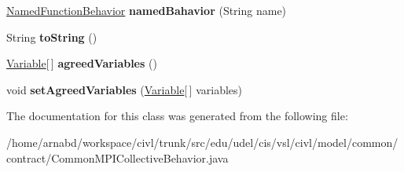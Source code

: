 \begin{DoxyCompactItemize}
\item 
\hypertarget{classedu_1_1udel_1_1cis_1_1vsl_1_1civl_1_1model_1_1common_1_1contract_1_1CommonMPICollectiveBehavior_a52d8d5bb5323585c16830e81bdd0572c}{}\hyperlink{interfaceedu_1_1udel_1_1cis_1_1vsl_1_1civl_1_1model_1_1IF_1_1contract_1_1NamedFunctionBehavior}{Named\+Function\+Behavior} {\bfseries named\+Bahavior} (String name)\label{classedu_1_1udel_1_1cis_1_1vsl_1_1civl_1_1model_1_1common_1_1contract_1_1CommonMPICollectiveBehavior_a52d8d5bb5323585c16830e81bdd0572c}

\item 
\hypertarget{classedu_1_1udel_1_1cis_1_1vsl_1_1civl_1_1model_1_1common_1_1contract_1_1CommonMPICollectiveBehavior_ac7ac11f1d649557ed4fe312abd7c0ea4}{}String {\bfseries to\+String} ()\label{classedu_1_1udel_1_1cis_1_1vsl_1_1civl_1_1model_1_1common_1_1contract_1_1CommonMPICollectiveBehavior_ac7ac11f1d649557ed4fe312abd7c0ea4}

\item 
\hypertarget{classedu_1_1udel_1_1cis_1_1vsl_1_1civl_1_1model_1_1common_1_1contract_1_1CommonMPICollectiveBehavior_ac275fd669c48e972b35ddadf31b9be1a}{}\hyperlink{interfaceedu_1_1udel_1_1cis_1_1vsl_1_1civl_1_1model_1_1IF_1_1variable_1_1Variable}{Variable}\mbox{[}$\,$\mbox{]} {\bfseries agreed\+Variables} ()\label{classedu_1_1udel_1_1cis_1_1vsl_1_1civl_1_1model_1_1common_1_1contract_1_1CommonMPICollectiveBehavior_ac275fd669c48e972b35ddadf31b9be1a}

\item 
\hypertarget{classedu_1_1udel_1_1cis_1_1vsl_1_1civl_1_1model_1_1common_1_1contract_1_1CommonMPICollectiveBehavior_ac3c04665841bd7e326803be29075df02}{}void {\bfseries set\+Agreed\+Variables} (\hyperlink{interfaceedu_1_1udel_1_1cis_1_1vsl_1_1civl_1_1model_1_1IF_1_1variable_1_1Variable}{Variable}\mbox{[}$\,$\mbox{]} variables)\label{classedu_1_1udel_1_1cis_1_1vsl_1_1civl_1_1model_1_1common_1_1contract_1_1CommonMPICollectiveBehavior_ac3c04665841bd7e326803be29075df02}

\end{DoxyCompactItemize}


The documentation for this class was generated from the following file\+:\begin{DoxyCompactItemize}
\item 
/home/arnabd/workspace/civl/trunk/src/edu/udel/cis/vsl/civl/model/common/contract/Common\+M\+P\+I\+Collective\+Behavior.\+java\end{DoxyCompactItemize}
